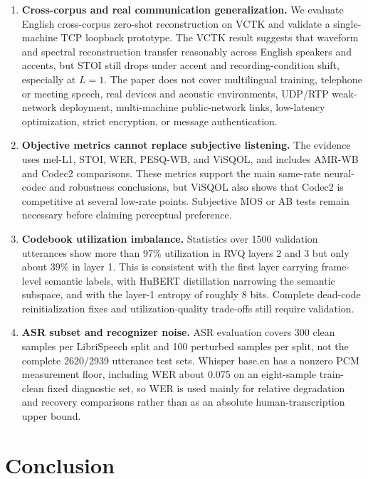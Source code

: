 ﻿\documentclass[conference]{IEEEtran}
\begin{document}
\begin{enumerate}
  \item \textbf{Cross-corpus and real communication generalization.} We evaluate English cross-corpus zero-shot reconstruction on VCTK and validate a single-machine TCP loopback prototype. The VCTK result suggests that waveform and spectral reconstruction transfer reasonably across English speakers and accents, but STOI still drops under accent and recording-condition shift, especially at \(L=1\). The paper does not cover multilingual training, telephone or meeting speech, real devices and acoustic environments, UDP/RTP weak-network deployment, multi-machine public-network links, low-latency optimization, strict encryption, or message authentication.
  \item \textbf{Objective metrics cannot replace subjective listening.} The evidence uses mel-L1, STOI, WER, PESQ-WB, and ViSQOL, and includes AMR-WB and Codec2 comparisons. These metrics support the main same-rate neural-codec and robustness conclusions, but ViSQOL also shows that Codec2 is competitive at several low-rate points. Subjective MOS or AB tests remain necessary before claiming perceptual preference.
  \item \textbf{Codebook utilization imbalance.} Statistics over 1500 validation utterances show more than 97\% utilization in RVQ layers 2 and 3 but only about 39\% in layer 1. This is consistent with the first layer carrying frame-level semantic labels, with HuBERT distillation narrowing the semantic subspace, and with the layer-1 entropy of roughly 8 bits. Complete dead-code reinitialization fixes and utilization-quality trade-offs still require validation.
  \item \textbf{ASR subset and recognizer noise.} ASR evaluation covers 300 clean samples per LibriSpeech split and 100 perturbed samples per split, not the complete 2620/2939 utterance test sets. Whisper base.en has a nonzero PCM measurement floor, including WER about 0.075 on an eight-sample train-clean fixed diagnostic set, so WER is used mainly for relative degradation and recovery comparisons rather than as an absolute human-transcription upper bound.
\end{enumerate}

\section{Conclusion}
\end{document}
